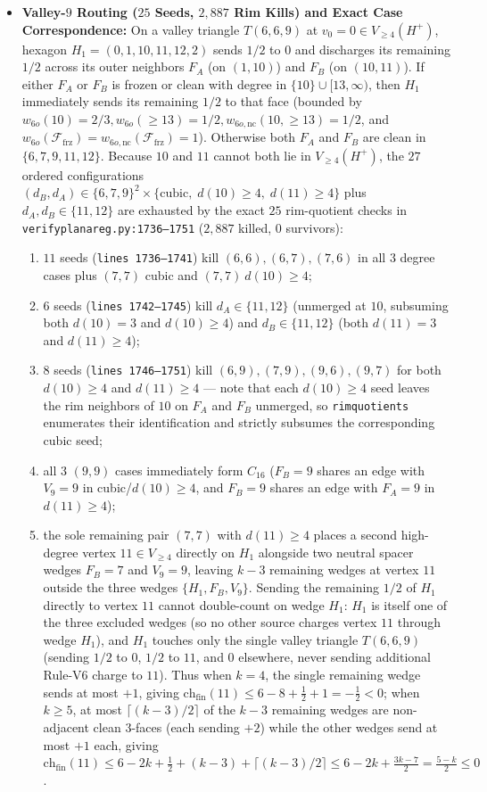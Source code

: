 \documentclass[11pt,reqno]{amsart}
\theoremstyle{plain}
\theoremstyle{definition}
\theoremstyle{remark}
\newcommand{\chf}{\mathrm{ch}_{\mathrm{fin}}}
\newcommand{\Ffrz}{\mathcal{F}_{\mathrm{frz}}}
\newcommand{\Vge}{V_{\ge 4}}
\DeclareRobustCommand{\_}{\ifmmode\text{\textunderscore}\else\textunderscore\allowbreak\fi}
\begin{document}
\begin{itemize}[leftmargin=1.8em]
  \item \textbf{Valley-$9$ Routing ($25$ Seeds, $2{,}887$ Rim Kills) and Exact Case Correspondence:} On a valley triangle $T(6,6,9)$ at $v_0 = 0 \in \Vge(H^+)$, hexagon $H_1 = (0, 1, 10, 11, 12, 2)$ sends $1/2$ to $0$ and discharges its remaining $1/2$ across its outer neighbors $F_A$ (on $(1,10)$) and $F_B$ (on $(10,11)$). If either $F_A$ or $F_B$ is frozen or clean with degree in $\{10\} \cup [13, \infty)$, then $H_1$ immediately sends its remaining $1/2$ to that face (bounded by $w_{6o}(10) = 2/3, w_{6o}(\ge 13) = 1/2, w_{6o,\mathrm{nc}}(10, \ge 13) = 1/2$, and $w_{6o}(\Ffrz) = w_{6o,\mathrm{nc}}(\Ffrz) = 1$). Otherwise both $F_A$ and $F_B$ are clean in $\{6, 7, 9, 11, 12\}$. Because $10$ and $11$ cannot both lie in $\Vge(H^+)$, the $27$ ordered configurations $(d_B, d_A) \in \{6, 7, 9\}^2 \times \{\text{cubic},\; d(10) \ge 4,\; d(11) \ge 4\}$ plus $d_A, d_B \in \{11, 12\}$ are exhausted by the exact $25$ rim-quotient checks in \texttt{verify\_planar\_eg.py:1736--1751} ($2{,}887$ killed, $0$ survivors):
  \begin{enumerate}[label=(\arabic*),leftmargin=2.0em]
    \item $11$ seeds (\texttt{lines 1736--1741}) kill $(6,6), (6,7), (7,6)$ in all $3$ degree cases plus $(7,7)$ cubic and $(7,7)\ d(10) \ge 4$;
    \item $6$ seeds (\texttt{lines 1742--1745}) kill $d_A \in \{11, 12\}$ (unmerged at $10$, subsuming both $d(10)=3$ and $d(10) \ge 4$) and $d_B \in \{11, 12\}$ (both $d(11)=3$ and $d(11) \ge 4$);
    \item $8$ seeds (\texttt{lines 1746--1751}) kill $(6,9), (7,9), (9,6), (9,7)$ for both $d(10) \ge 4$ and $d(11) \ge 4$ — note that each $d(10) \ge 4$ seed leaves the rim neighbors of $10$ on $F_A$ and $F_B$ unmerged, so \texttt{rim\_quotients} enumerates their identification and strictly subsumes the corresponding cubic seed;
    \item all $3$ $(9,9)$ cases immediately form $C_{16}$ ($F_B=9$ shares an edge with $V_9=9$ in cubic/$d(10)\ge 4$, and $F_B=9$ shares an edge with $F_A=9$ in $d(11)\ge 4$);
    \item the sole remaining pair $(7,7)$ with $d(11) \ge 4$ places a second high-degree vertex $11 \in \Vge$ directly on $H_1$ alongside two neutral spacer wedges $F_B = 7$ and $V_9 = 9$, leaving $k - 3$ remaining wedges at vertex $11$ outside the three wedges $\{H_1, F_B, V_9\}$. Sending the remaining $1/2$ of $H_1$ directly to vertex $11$ cannot double-count on wedge $H_1$: $H_1$ is itself one of the three excluded wedges (so no other source charges vertex $11$ through wedge $H_1$), and $H_1$ touches only the single valley triangle $T(6, 6, 9)$ (sending $1/2$ to $0$, $1/2$ to $11$, and $0$ elsewhere, never sending additional Rule-V6 charge to $11$). Thus when $k = 4$, the single remaining wedge sends at most $+1$, giving $\chf(11) \le 6 - 8 + \frac{1}{2} + 1 = -\frac{1}{2} < 0$; when $k \ge 5$, at most $\lceil(k-3)/2\rceil$ of the $k - 3$ remaining wedges are non-adjacent clean $3$-faces (each sending $+2$) while the other wedges send at most $+1$ each, giving $\chf(11) \le 6 - 2k + \frac{1}{2} + (k - 3) + \lceil(k - 3)/2\rceil \le 6 - 2k + \frac{3k - 7}{2} = \frac{5 - k}{2} \le 0$.

\end{enumerate}
\end{itemize}
\end{document}
